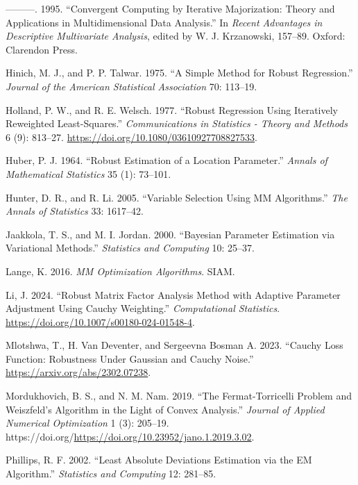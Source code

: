 \documentclass[
  12pt,
  letterpaper,
  DIV=11,
  numbers=noendperiod]{scrartcl}
\newlength{\cslhangindent}
\newenvironment{CSLReferences}[2] %
 {\begin{list}{}{%
  \setlength{\itemindent}{0pt}
  \setlength{\leftmargin}{0pt}
  \setlength{\parsep}{0pt}
  \ifodd #1
   \setlength{\leftmargin}{\cslhangindent}
   \setlength{\itemindent}{-1\cslhangindent}
  \fi
  \setlength{\itemsep}{#2\baselineskip}}}
 {\end{list}}
\theoremstyle{definition}
\theoremstyle{plain}
\theoremstyle{plain}
\theoremstyle{remark}
\begin{document}
\begin{CSLReferences}{1}{0}
---------. 1995. {``{Convergent Computing by Iterative Majorization:
Theory and Applications in Multidimensional Data Analysis}.''} In
\emph{Recent Advantages in Descriptive Multivariate Analysis}, edited by
W. J. Krzanowski, 157--89. Oxford: Clarendon Press.

Hinich, M. J., and P. P. Talwar. 1975. {``A Simple Method for Robust
Regression.''} \emph{Journal of the American Statistical Association}
70: 113--19.

Holland, P. W., and R. E. Welsch. 1977. {``Robust Regression Using
Iteratively Reweighted Least-Squares.''} \emph{Communications in
Statistics - Theory and Methods} 6 (9): 813--27.
\url{https://doi.org/10.1080/03610927708827533}.

Huber, P. J. 1964. {``Robust Estimation of a Location Parameter.''}
\emph{Annals of Mathematical Statistics} 35 (1): 73--101.

Hunter, D. R., and R. Li. 2005. {``{Variable Selection Using MM
Algorithms}.''} \emph{The Annals of Statistics} 33: 1617--42.

Jaakkola, T. S., and M. I. Jordan. 2000. {``{Bayesian Parameter
Estimation via Variational Methods}.''} \emph{Statistics and Computing}
10: 25--37.

Lange, K. 2016. \emph{MM Optimization Algorithms}. SIAM.

Li, J. 2024. {``Robust Matrix Factor Analysis Method with Adaptive
Parameter Adjustment Using Cauchy Weighting.''} \emph{Computational
Statistics}. \url{https://doi.org/10.1007/s00180-024-01548-4}.

Mlotshwa, T., H. Van Deventer, and Sergeevna Bosman A. 2023. {``Cauchy
Loss Function: Robustness Under Gaussian and Cauchy Noise.''}
\url{https://arxiv.org/abs/2302.07238}.

Mordukhovich, B. S., and N. M. Nam. 2019. {``The Fermat-Torricelli
Problem and Weiszfeld's Algorithm in the Light of Convex Analysis.''}
\emph{Journal of Applied Numerical Optimization} 1 (3): 205--19.
https://doi.org/\url{https://doi.org/10.23952/jano.1.2019.3.02}.

Phillips, R. F. 2002. {``Least Absolute Deviations Estimation via the EM
Algorithm.''} \emph{Statistics and Computing} 12: 281--85.


\end{CSLReferences}
\end{document}
